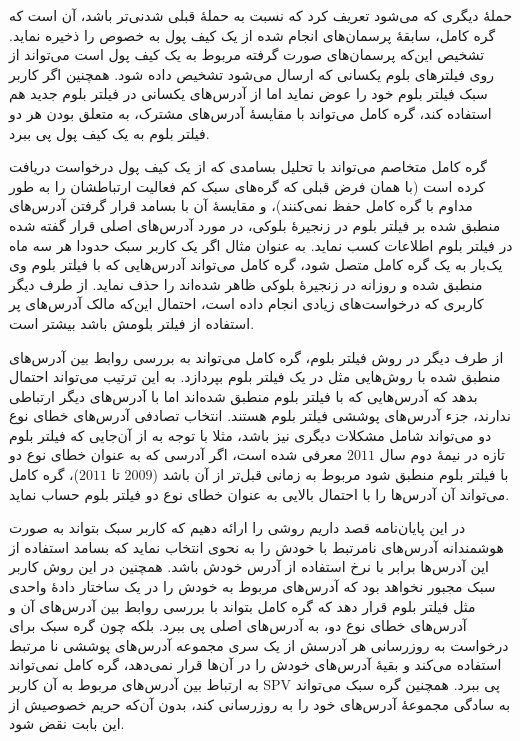 حملهٔ دیگری که می‌شود تعریف کرد که نسبت به حملهٔ قبلی شدنی‌تر باشد، آن است که گره کامل، سابقهٔ پرسمان‌های انجام شده از یک کیف پول به خصوص را ذخیره نماید. تشخیص این‌که پرسمان‌های صورت گرفته مربوط به یک کیف پول است می‌تواند از روی فیلتر‌های بلوم یکسانی که ارسال می‌شود تشخیص داده شود. همچنین اگر کاربر سبک فیلتر بلوم خود را عوض نماید اما از آدرس‌های یکسانی در فیلتر بلوم جدید هم استفاده کند،‌ گره کامل می‌تواند با مقایسهٔ آدرس‌های مشترک، به متعلق بودن هر دو فیلتر بلوم به یک کیف پول پی ببرد.

گره کامل متخاصم می‌تواند با تحلیل بسامدی که از یک کیف پول درخواست دریافت کرده است (با همان فرض قبلی که گره‌های سبک کم فعالیت ارتباطشان را به طور مداوم با گره کامل حفظ نمی‌کنند)، و مقایسهٔ آن با بسامد قرار گرفتن آدرس‌های منطبق شده بر فیلتر بلوم در زنجیرهٔ بلوکی، در مورد آدرس‌های اصلی قرار گفته شده در فیلتر بلوم اطلاعات کسب نماید. به عنوان مثال اگر یک کاربر سبک حدودا هر سه ماه یک‌بار به یک گره کامل متصل شود، گره کامل می‌تواند آدرس‌هایی که با فیلتر بلوم وی منطبق شده و روزانه در زنجیرهٔ بلوکی ظاهر شده‌اند را حذف نماید. از طرف دیگر کاربری که درخواست‌های زیادی انجام داده است، احتمال این‌که مالک آدرس‌های پر استفاده از فیلتر بلومش باشد بیشتر است. 

از طرف دیگر در روش فیلتر بلوم، گره کامل می‌تواند به بررسی روابط بین آدرس‌های منطبق شده با روش‌هایی مثل \cite{Meiklejohn2013} در یک فیلتر بلوم بپردازد. به این ترتیب می‌تواند احتمال بدهد که آدرس‌هایی که با فیلتر بلوم منطبق شده‌اند اما با آدرس‌های دیگر ارتباطی ندارند، جزء آدرس‌های پوششی فیلتر بلوم هستند\cite{Gervais2014}.  انتخاب تصادفی آدرس‌های خطای نوع دو می‌تواند شامل مشکلات دیگری نیز باشد، مثلا با توجه به \cite{Gervais2014} از آن‌جایی که فیلتر بلوم تازه در نیمهٔ دوم سال $2011$ معرفی شده است، اگر آدرسی که به عنوان خطای نوع دو با فیلتر بلوم منطبق شود مربوط به زمانی قبل‌تر از آن باشد ($2009$ تا $2011$)، گره کامل می‌تواند آن آدرس‌ها را با احتمال بالایی به عنوان خطای نوع دو فیلتر بلوم حساب نماید.

در این پایان‌نامه قصد داریم روشی را ارائه دهیم که کاربر سبک بتواند به صورت هوشمندانه آدرس‌های نامرتبط با خودش را به نحوی انتخاب نماید که بسامد استفاده از این آدرس‌ها برابر با نرخ استفاده از آدرس خودش باشد. همچنین در این روش کاربر سبک مجبور نخواهد بود که آدرس‌های مربوط به خودش را در یک ساختار دادهٔ واحدی مثل فیلتر بلوم قرار دهد که گره کامل بتواند با بررسی روابط بین آدرس‌های آن و آدرس‌های خطای نوع دو،‌ به آدرس‌های اصلی پی ببرد. بلکه چون گره سبک برای درخواست به روزرسانی هر آدرسش از یک سری مجموعه آدرس‌های پوششی نا مرتبط استفاده می‌کند و بقیهٔ آدرس‌های خودش را در آن‌ها قرار نمی‌دهد، گره کامل نمی‌تواند به ارتباط بین آدرس‌های مربوط به آن کاربر SPV پی ببرد. همچنین گره سبک می‌تواند به سادگی مجموعهٔ آدرس‌های خود را به روزرسانی کند، بدون آن‌که حریم خصوصیش از این بابت نقض شود.  



